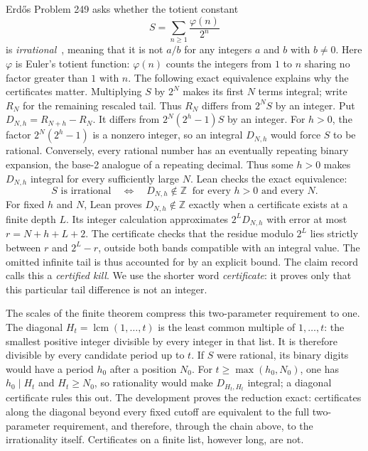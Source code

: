 \documentclass[11pt]{article}
\begin{document}
Erd\H{o}s Problem 249 asks whether the totient constant
\[
S=\sum_{n\ge 1}\frac{\varphi(n)}{2^{n}}
\]
is \emph{irrational}~\cite{erdosgraham}, meaning that it is not $a/b$ for any integers $a$ and
$b$ with $b\ne 0$.  Here $\varphi$ is Euler's totient function: $\varphi(n)$
counts the integers from $1$ to $n$ sharing no factor greater than $1$ with
$n$.  The following exact equivalence explains why the certificates matter.
Multiplying $S$ by $2^N$ makes its first $N$ terms integral; write $R_N$ for
the remaining rescaled tail.  Thus $R_N$ differs from $2^N S$ by an integer.
Put $D_{N,h}=R_{N+h}-R_N$.  It differs from $2^N(2^h-1)S$ by an integer.
For $h>0$, the factor $2^N(2^h-1)$ is a nonzero integer, so an integral
$D_{N,h}$ would force $S$ to be rational.  Conversely, every rational number
has an eventually repeating binary expansion, the base-2 analogue of a
repeating decimal.  Thus some $h>0$ makes
$D_{N,h}$ integral for every sufficiently large $N$.  Lean checks the exact
equivalence:
\[
S\text{ is irrational}\quad\Longleftrightarrow\quad
D_{N,h}\notin\mathbb Z\ \text{ for every $h>0$ and every $N$}.
\]
For fixed $h$ and $N$, Lean proves $D_{N,h}\notin\mathbb Z$ exactly when a
certificate exists at a finite depth $L$.  Its integer calculation approximates
$2^L D_{N,h}$ with error at most $r=N+h+L+2$.  The certificate checks that
the residue modulo $2^L$ lies strictly between $r$ and $2^L-r$, outside both
bands compatible with an integral value.  The omitted infinite tail is thus
accounted for by an explicit bound.  The claim record calls this a
\emph{certified kill}.  We use the shorter word \emph{certificate}: it proves only that
this particular tail difference is not an integer.

The scales of the finite theorem compress this two-parameter requirement to
one.  The diagonal $H_t=\operatorname{lcm}(1,\dots,t)$ is the least common
multiple of $1,\dots,t$: the smallest positive integer divisible by every
integer in that list.  It is therefore divisible by every candidate period
up to $t$.  If $S$ were rational, its binary digits would have a period
$h_0$ after a position $N_0$.  For $t\geq\max(h_0,N_0)$, one has
$h_0\mid H_t$ and $H_t\geq N_0$, so rationality would make
$D_{H_t,H_t}$ integral; a diagonal certificate rules this out.  The
development proves the reduction exact: certificates along the diagonal
beyond every fixed cutoff
are equivalent to the full two-parameter requirement, and therefore, through
the chain
above, to the irrationality itself.  Certificates on a finite list, however
long, are not.
\end{document}
